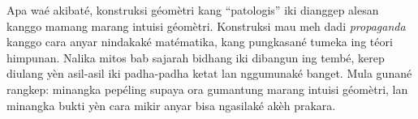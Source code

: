 \documentclass[../../../include/open-logic-section]{subfiles}
\begin{document}
Apa waé akibaté, konstruksi
géomètri kang ``patologis'' iki
dianggep alesan kanggo mamang
marang intuisi géomètri.
Konstruksi mau meh dadi
\emph{propaganda} kanggo
cara anyar nindakaké
matématika, kang pungkasané
tumeka ing téori himpunan.
Nalika mitos bab sajarah
bidhang iki dibangun
ing tembé, kerep diulang
yèn asil-asil iki
padha-padha ketat
lan nggumunaké banget.
Mula gunané rangkep:
minangka pepéling supaya
ora gumantung marang
intuisi géomètri,
lan minangka bukti
yèn cara mikir anyar
bisa ngasilaké
akèh prakara.
\end{document}
